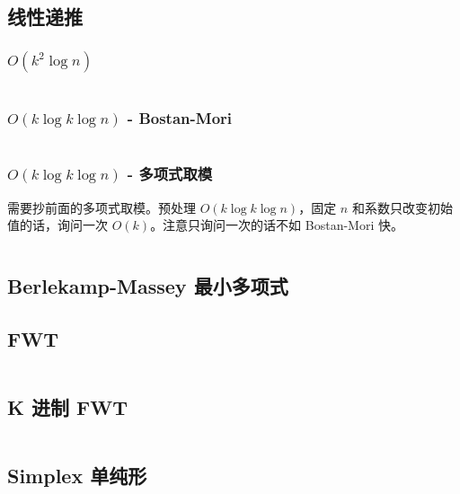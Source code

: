 \documentclass[titlepage, a4paper]{article}
\begin{document}
\begin{multicols}{2}
\begin{spacing}{0.6}
				\subsection{线性递推}
					\subsubsection*{$O(k^2 \log n)$}
						\inputminted{cpp}{src/Math/线性递推.cpp}
					\subsubsection*{$O(k \log k \log n)$ - Bostan-Mori}
						\inputminted{cpp}{src/Math/快速线性递推-bostan-mori.cpp}
					\subsubsection*{$O(k \log k \log n)$ - 多项式取模}
						需要抄前面的多项式取模。预处理 $O(k \log k \log n)$，固定 $n$ 和系数只改变初始值的话，询问一次 $O(k)$。注意只询问一次的话不如 Bostan-Mori 快。
						\inputminted{cpp}{src/Math/快速线性递推-多项式取模.cpp}
				\subsection{Berlekamp-Massey 最小多项式}
					
				\subsection{FWT}
					\inputminted{cpp}{src/Math/FWT.cpp}
				\subsection{K 进制 FWT}
					\inputminted{cpp}{src/tbr/fwt.cpp}
				\subsection{Simplex 单纯形}
					\inputminted{cpp}{src/Math/Simplex.cpp}

\end{spacing}
\end{multicols}
\end{document}
